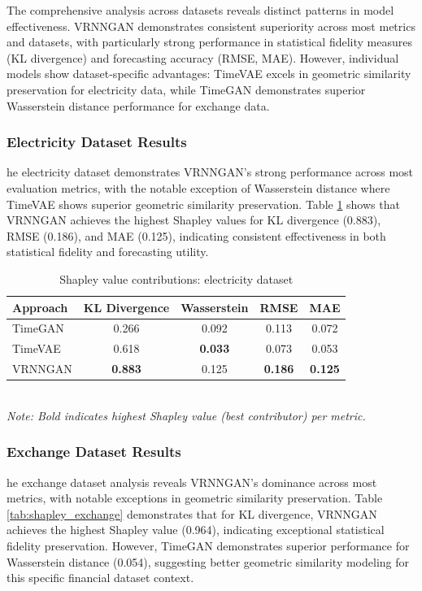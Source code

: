 \documentclass{article}
\begin{document}
The comprehensive analysis across datasets reveals distinct patterns in model effectiveness. VRNNGAN demonstrates consistent superiority across most metrics and datasets, with particularly strong performance in statistical fidelity measures (KL divergence) and forecasting accuracy (RMSE, MAE). However, individual models show dataset-specific advantages: TimeVAE excels in geometric similarity preservation for electricity data, while TimeGAN demonstrates superior Wasserstein distance performance for exchange data. 

\subsubsection{Electricity Dataset Results}

he electricity dataset demonstrates VRNNGAN's strong performance across most evaluation metrics, with the notable exception of Wasserstein distance where TimeVAE shows superior geometric similarity preservation. Table \ref{tab:shapley_electricity} shows that VRNNGAN achieves the highest Shapley values for KL divergence (0.883), RMSE (0.186), and MAE (0.125), indicating consistent effectiveness in both statistical fidelity and forecasting utility.
\begin{table}[H]
\centering
\caption{Shapley value contributions: electricity dataset}
\label{tab:shapley_electricity}
\begin{tabular}{lcccc}
\toprule
\textbf{Approach} & \textbf{KL Divergence} & \textbf{Wasserstein} & \textbf{RMSE} & \textbf{MAE} \\
\midrule
TimeGAN & 0.266 & 0.092 & 0.113 & 0.072 \\
TimeVAE & 0.618 & \textbf{0.033} & 0.073 & 0.053 \\
VRNNGAN & \textbf{0.883} & 0.125 & \textbf{0.186} & \textbf{0.125} \\
\bottomrule
\end{tabular}
\\[0.5em]
\footnotesize
\textit{Note: Bold indicates highest Shapley value (best contributor) per metric.}
\end{table}

\subsubsection{Exchange Dataset Results}
he exchange dataset analysis reveals VRNNGAN's dominance across most metrics, with notable exceptions in geometric similarity preservation. Table \ref{tab:shapley_exchange} demonstrates that for KL divergence, VRNNGAN achieves the highest Shapley value (0.964), indicating exceptional statistical fidelity preservation. However, TimeGAN demonstrates superior performance for Wasserstein distance (0.054), suggesting better geometric similarity modeling for this specific financial dataset context.
\end{document}
